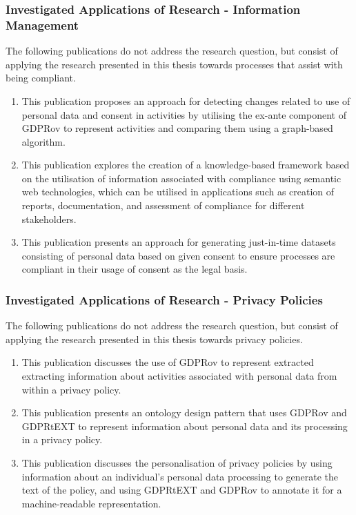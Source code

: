 \subsubsection{Investigated Applications of Research - Information Management}
The following publications do not address the research question, but consist of applying the research presented in this thesis towards processes that assist with being compliant.
\begin{enumerate}[resume]
    \item \textbf{}
    \newline This publication proposes an approach for detecting changes related to use of personal data and consent in activities by utilising the ex-ante component of GDPRov to represent activities and comparing them using a graph-based algorithm.
    \item \textbf{}
    \newline This publication explores the creation of a knowledge-based framework based on the utilisation of information associated with compliance using semantic web technologies, which can be utilised in applications such as creation of reports, documentation, and assessment of compliance for different stakeholders.
    \item \textbf{}
    \newline This publication presents an approach for generating just-in-time datasets consisting of personal data based on given consent to ensure processes are compliant in their usage of consent as the legal basis.
\end{enumerate}

\subsubsection{Investigated Applications of Research - Privacy Policies}
The following publications do not address the research question, but consist of applying the research presented in this thesis towards privacy policies.
\begin{enumerate}[resume]
    \item \textbf{}
    \newline This publication discusses the use of GDPRov to represent extracted extracting information about activities associated with personal data from within a privacy policy.
    \item \textbf{}
    \newline This publication presents an ontology design pattern that uses GDPRov and GDPRtEXT to represent information about personal data and its processing in a privacy policy.
    \item \textbf{}
    \newline This publication discusses the personalisation of privacy policies by using information about an individual's personal data processing to generate the text of the policy, and using GDPRtEXT and GDPRov to annotate it for a machine-readable representation.
\end{enumerate}

